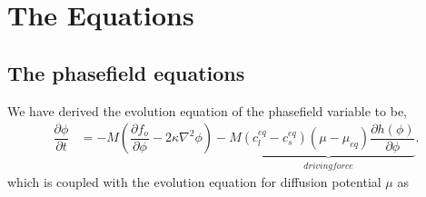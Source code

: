 \documentclass[a4paper]{report}
\begin{document}
% 
%
%
% 
%


\chapter{The Equations}
\section{The phasefield equations}
We have derived the evolution equation of the phasefield variable to be,
  \begin{align}
  \dfrac{\partial \phi}{\partial t} &= -M \left(\dfrac{\partial f_o}{\partial \phi} - 2\kappa\nabla^{2}\phi\right)  
					-M\underbrace{(c_l^{eq} - c_s^{eq})\left(\mu-\mu_{eq}\right)\dfrac{\partial h\left(\phi\right)}{\partial \phi}}_{driving force}.
  \end{align}
which is coupled with the evolution equation for diffusion potential $\mu$ as
\end{document}
